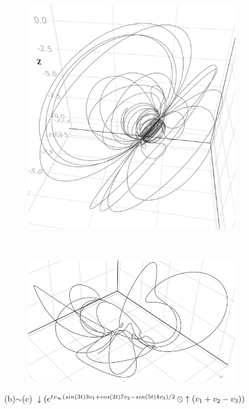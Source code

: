 \documentclass{juliacon}
\DeclareMathOperator*{\obackslash}{\text{\reflectbox{$\oslash$}}}
\begin{document}
\begin{figure}[ht]
	\begin{subfigure}[b]{0.16\textwidth}
		\includegraphics[width=\textwidth]{img/orbit-2.png}
	\end{subfigure}
	~
	\begin{subfigure}[b]{0.28\textwidth}
		\includegraphics[width=\textwidth]{img/orbit-4.png}
	\end{subfigure}
	\caption*{(b)$\sim$(c) $\downarrow(e^{tv_\infty(sin(3t)3v_1+cos(2t)7v_2-sin(5t)4v_3)/2}\obackslash\uparrow(v_1+v_2-v_3))$}
\end{figure}


\end{document}
